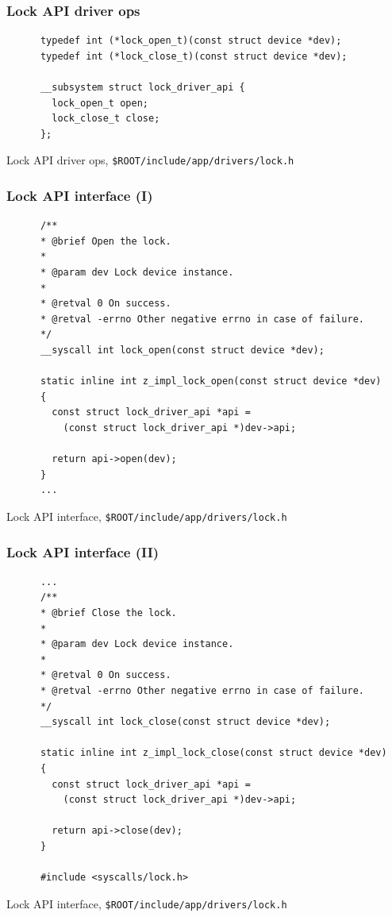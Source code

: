 \documentclass[handout]{beamer}
\begin{document}
\begin{frame}[fragile]
  \frametitle{Lock API driver ops}

  \begin{listing}[H]
    \begin{verbatim}
      typedef int (*lock_open_t)(const struct device *dev);
      typedef int (*lock_close_t)(const struct device *dev);

      __subsystem struct lock_driver_api {
        lock_open_t open;
        lock_close_t close;
      };
    \end{verbatim}
    \caption{Lock API driver ops, \texttt{\$ROOT/include/app/drivers/lock.h}}
  \end{listing}
\end{frame}

\begin{frame}[fragile]
  \frametitle{Lock API interface (I)}

  \begin{listing}[H]
    \begin{verbatim}
      /**
      * @brief Open the lock.
      *
      * @param dev Lock device instance.
      *
      * @retval 0 On success.
      * @retval -errno Other negative errno in case of failure.
      */
      __syscall int lock_open(const struct device *dev);
  
      static inline int z_impl_lock_open(const struct device *dev)
      {
        const struct lock_driver_api *api =
          (const struct lock_driver_api *)dev->api;

        return api->open(dev);
      }
      ...
    \end{verbatim}
    \caption{Lock API interface,
      \texttt{\$ROOT/include/app/drivers/lock.h}}
  \end{listing}
\end{frame}

\begin{frame}[fragile]
  \frametitle{Lock API interface (II)}

  \begin{listing}[H]
    \begin{verbatim}
      ...
      /**
      * @brief Close the lock.
      *
      * @param dev Lock device instance.
      *
      * @retval 0 On success.
      * @retval -errno Other negative errno in case of failure.
      */
      __syscall int lock_close(const struct device *dev);

      static inline int z_impl_lock_close(const struct device *dev)
      {
        const struct lock_driver_api *api =
          (const struct lock_driver_api *)dev->api;

        return api->close(dev);
      }

      #include <syscalls/lock.h>
    \end{verbatim}
    \caption{Lock API interface,
      \texttt{\$ROOT/include/app/drivers/lock.h}}
  \end{listing}
\end{frame}
\end{document}
